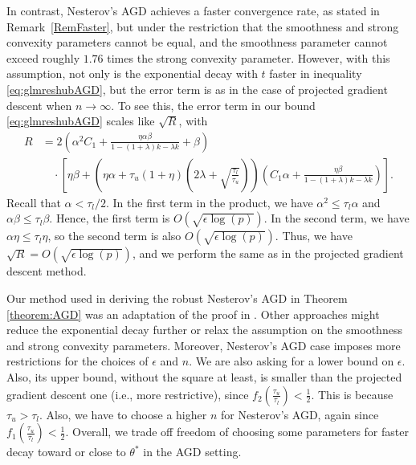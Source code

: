 \documentclass{article}
\begin{document}
In contrast, Nesterov's AGD achieves a faster convergence rate, as stated in Remark~\ref{RemFaster}, but under the restriction that the smoothness and strong convexity parameters cannot be equal, and the smoothness parameter cannot exceed roughly $1.76$ times the strong convexity parameter. However, with this assumption, not only is the exponential decay with $t$ faster in inequality \eqref{eq:glmreshubAGD}, but the error term is as in the case of projected gradient descent when $n \rightarrow \infty$. To see this, the error term in our bound \eqref{eq:glmreshubAGD} scales like $\sqrt{R}$, with
\begin{align*}
R &= 2\left(\alpha^2 C_1 + \frac{\eta\alpha\beta}{1 - (1 + \lambda)k - \lambda k} + \beta\right)\\
& \quad \cdot \left[\eta\beta + \left(\eta\alpha + \tau_u(1 + \eta)\left(2\lambda + \sqrt{\frac{\tau_l}{\tau_u}}\right)\right)\left(C_1\alpha + \frac{\eta\beta}{1 - (1 + \lambda)k - \lambda k}\right)\right].
\end{align*}
Recall that $\alpha < \tau_l/2$. In the first term in the product, we have $\alpha^2 \le \tau_l\alpha$ and $\alpha\beta \le \tau_l\beta$. Hence, the first term is $O\left(\sqrt{\epsilon \log(p)}\right)$. In the second term, we have $\alpha\eta \le \tau_l\eta$, so the second term is also $O\left(\sqrt{\epsilon \log(p)}\right)$. Thus, we have $\sqrt{R} = O\left(\sqrt{\epsilon \log(p)}\right)$, and we perform the same as in the projected gradient descent method. 

Our method used in deriving the robust Nesterov's AGD in Theorem \ref{theorem:AGD} was an adaptation of the proof in \cite{Recht}. Other approaches might reduce the exponential decay further or relax the assumption on the smoothness and strong convexity parameters. Moreover, Nesterov's AGD case imposes more restrictions for the choices of $\epsilon$ and $n$. We are also asking for a lower bound on $\epsilon$. Also, its upper bound, without the square at least, is smaller than the projected gradient descent one (i.e., more restrictive), since $f_2(\frac{\tau_u}{\tau_l}) < \frac{1}{2}$. This is because $\tau_u > \tau_l$. Also, we have to choose a higher $n$ for Nesterov's AGD, again since $f_1(\frac{\tau_u}{\tau_l}) < \frac{1}{2}$. Overall, we trade off freedom of choosing some parameters for faster decay toward or close to $\theta^*$ in the AGD setting.
\end{document}
